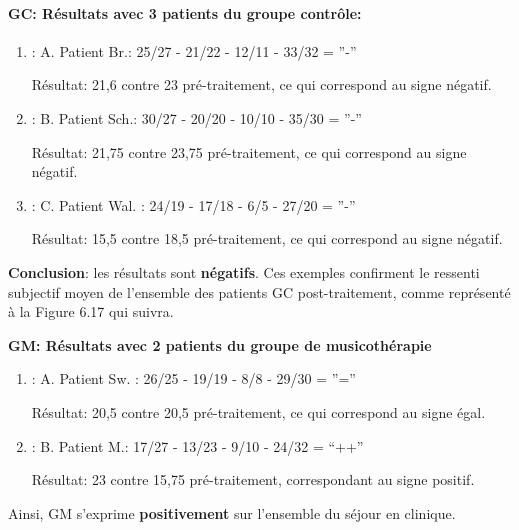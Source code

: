 \paragraph{ GC: Résultats avec 3 patients du groupe contrôle:}

\begin{enumerate}
\item : A. Patient Br.:  25/27 - 21/22 - 12/11 - 33/32 =  ''-''
  
          Résultat: 21,6 contre 23 pré-traitement,  ce qui
        correspond au signe négatif.
      \item : B. Patient Sch.: 30/27 - 20/20 -  10/10 - 35/30 = ''-''
        
         Résultat: 21,75 contre 23,75 pré-traitement, ce qui
        correspond au signe négatif.
              
 		\item :  C. Patient Wal. : 24/19 -  17/18 - 6/5 -
                  27/20 =  ''-''

                  Résultat: 15,5 contre 18,5 pré-traitement, ce qui
        correspond au signe négatif.
 	\end{enumerate}
        

       \textbf{ Conclusion}: les résultats sont \textbf{négatifs}.
        Ces exemples confirment  
        le ressenti subjectif moyen de l'ensemble des patients
        GC post-traitement, comme représenté à la Figure 6.17
        qui suivra.

       \textbf{ GM: Résultats avec 2 patients du groupe de musicothérapie}

\begin{enumerate}
 		\item : A. Patient Sw. : 26/25 - 19/19 - 8/8 - 29/30 =  ''='' 
                
                
                
  Résultat: 20,5 contre 20,5 pré-traitement, ce qui
        correspond au signe égal.



 		\item : B. Patient M.: 17/27 - 13/23 -  9/10 - 24/32 = ``++''
 	
              Résultat: 23 contre 15,75 pré-traitement, correspondant
              au signe positif. 
            \end{enumerate}
            
                 Ainsi,  GM s'exprime
                 \textbf{positivement }
                 sur l'ensemble du séjour en clinique.

